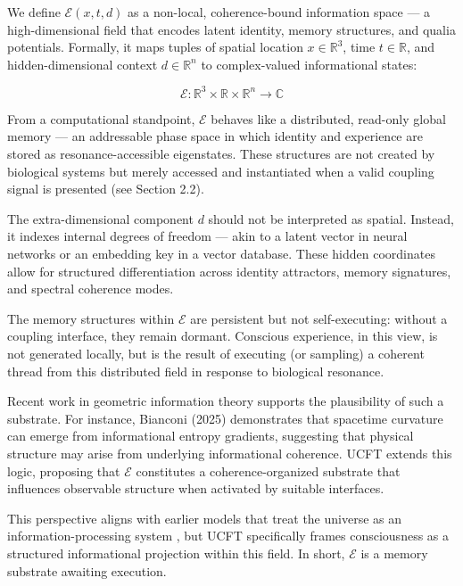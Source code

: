 \documentclass[titlepage]{article}
\begin{document}
We define $\mathcal{E}(x, t, d)$ as a non-local, coherence-bound information space — a high-dimensional field that encodes latent identity, memory structures, and qualia potentials. Formally, it maps tuples of spatial location $x \in \mathbb{R}^3$, time $t \in \mathbb{R}$, and hidden-dimensional context $d \in \mathbb{R}^n$ to complex-valued informational states:

\[
\mathcal{E} : \mathbb{R}^3 \times \mathbb{R} \times \mathbb{R}^n \rightarrow \mathbb{C}
\]

From a computational standpoint, $\mathcal{E}$ behaves like a distributed, read-only global memory — an addressable phase space in which identity and experience are stored as resonance-accessible eigenstates. These structures are not created by biological systems but merely accessed and instantiated when a valid coupling signal is presented (see Section 2.2).

The extra-dimensional component $d$ should not be interpreted as spatial. Instead, it indexes internal degrees of freedom — akin to a latent vector in neural networks or an embedding key in a vector database. These hidden coordinates allow for structured differentiation across identity attractors, memory signatures, and spectral coherence modes.

The memory structures within $\mathcal{E}$ are persistent but not self-executing: without a coupling interface, they remain dormant. Conscious experience, in this view, is not generated locally, but is the result of executing (or sampling) a coherent thread from this distributed field in response to biological resonance.

Recent work in geometric information theory supports the plausibility of such a substrate. For instance, Bianconi (2025) demonstrates that spacetime curvature can emerge from informational entropy gradients, suggesting that physical structure may arise from underlying informational coherence. UCFT extends this logic, proposing that $\mathcal{E}$ constitutes a coherence-organized substrate that influences observable structure when activated by suitable interfaces.

This perspective aligns with earlier models that treat the universe as an information-processing system \parencite{lloyd2006, landauer1991}, but UCFT specifically frames consciousness as a structured informational projection within this field. In short, $\mathcal{E}$ is a memory substrate awaiting execution.


\newpage
\printbibliography
\end{document}
